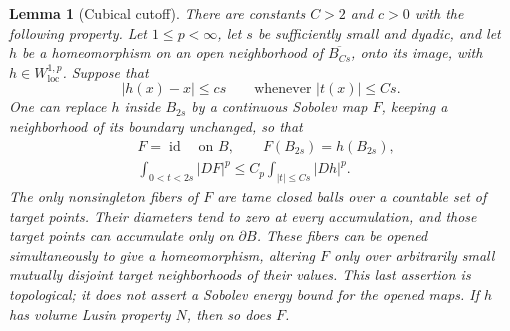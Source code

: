 \documentclass[11pt]{article}
\numberwithin{equation}{section}
\newtheorem{lemma}[theorem]{Lemma}
\theoremstyle{definition}
\theoremstyle{remark}
\begin{document}
\begin{lemma}[Cubical cutoff]\label{hp:cutoff}
There are constants $C>2$ and $c>0$ with the following property.
Let $1\leq p<\infty$, let $s$ be sufficiently small and dyadic, and
let $h$ be a homeomorphism on an open neighborhood of
$\overline{B_{Cs}}$, onto its image, with
$h\in W^{1,p}_{\mathrm{loc}}$.  Suppose that
\begin{equation}\label{hp:cutoff-closeness}
 |h(x)-x|\leq cs\qquad\text{whenever }|t(x)|\leq Cs.
\end{equation}
One can replace $h$ inside $B_{2s}$ by a continuous Sobolev map $F$,
keeping a neighborhood of its boundary unchanged, so that
\begin{align}
 &F=\operatorname{id}\quad\text{on }B,
 \qquad F(B_{2s})=h(B_{2s}),\label{hp:cutoff-image}\\
 &\int_{0<t<2s}|DF|^p
 \leq C_p\int_{|t|\leq Cs}|Dh|^p.\label{hp:cutoff-energy}
\end{align}
The only nonsingleton fibers of $F$ are tame closed balls over a
countable set of target points.  Their diameters tend to zero at every
accumulation, and those target points can accumulate only on
$\partial B$.  These fibers can be opened simultaneously to give a
homeomorphism, altering $F$ only over arbitrarily small mutually
disjoint target neighborhoods of their values.  This last assertion
is topological; it does not assert a Sobolev energy bound for the
opened maps.  If $h$ has volume Lusin property $N$, then so does $F$.
\end{lemma}
\end{document}
